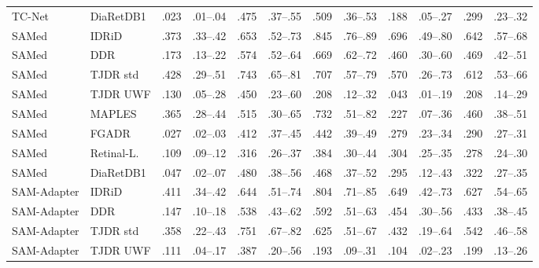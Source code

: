 \begin{landscape}
{\begin{longtable}{l l c c c c c c c c c c}
TC-Net & DiaRetDB1 & .023 & \scriptsize .01--.04 & .475 & \scriptsize .37--.55 & .509 & \scriptsize .36--.53 & .188 & \scriptsize .05--.27 & .299 & \scriptsize .23--.32 \\
SAMed & IDRiD & .373 & \scriptsize .33--.42 & .653 & \scriptsize .52--.73 & .845 & \scriptsize .76--.89 & .696 & \scriptsize .49--.80 & .642 & \scriptsize .57--.68 \\
SAMed & DDR & .173 & \scriptsize .13--.22 & .574 & \scriptsize .52--.64 & .669 & \scriptsize .62--.72 & .460 & \scriptsize .30--.60 & .469 & \scriptsize .42--.51 \\
SAMed & TJDR std & .428 & \scriptsize .29--.51 & .743 & \scriptsize .65--.81 & .707 & \scriptsize .57--.79 & .570 & \scriptsize .26--.73 & .612 & \scriptsize .53--.66 \\
SAMed & TJDR UWF & .130 & \scriptsize .05--.28 & .450 & \scriptsize .23--.60 & .208 & \scriptsize .12--.32 & .043 & \scriptsize .01--.19 & .208 & \scriptsize .14--.29 \\
SAMed & MAPLES & .365 & \scriptsize .28--.44 & .515 & \scriptsize .30--.65 & .732 & \scriptsize .51--.82 & .227 & \scriptsize .07--.36 & .460 & \scriptsize .38--.51 \\
SAMed & FGADR & .027 & \scriptsize .02--.03 & .412 & \scriptsize .37--.45 & .442 & \scriptsize .39--.49 & .279 & \scriptsize .23--.34 & .290 & \scriptsize .27--.31 \\
SAMed & Retinal-L. & .109 & \scriptsize .09--.12 & .316 & \scriptsize .26--.37 & .384 & \scriptsize .30--.44 & .304 & \scriptsize .25--.35 & .278 & \scriptsize .24--.30 \\
SAMed & DiaRetDB1 & .047 & \scriptsize .02--.07 & .480 & \scriptsize .38--.56 & .468 & \scriptsize .37--.52 & .295 & \scriptsize .12--.43 & .322 & \scriptsize .27--.35 \\
SAM-Adapter & IDRiD & .411 & \scriptsize .34--.42 & .644 & \scriptsize .51--.74 & .804 & \scriptsize .71--.85 & .649 & \scriptsize .42--.73 & .627 & \scriptsize .54--.65 \\
SAM-Adapter & DDR & .147 & \scriptsize .10--.18 & .538 & \scriptsize .43--.62 & .592 & \scriptsize .51--.63 & .454 & \scriptsize .30--.56 & .433 & \scriptsize .38--.45 \\
SAM-Adapter & TJDR std & .358 & \scriptsize .22--.43 & .751 & \scriptsize .67--.82 & .625 & \scriptsize .51--.67 & .432 & \scriptsize .19--.64 & .542 & \scriptsize .46--.58 \\
SAM-Adapter & TJDR UWF & .111 & \scriptsize .04--.17 & .387 & \scriptsize .20--.56 & .193 & \scriptsize .09--.31 & .104 & \scriptsize .02--.23 & .199 & \scriptsize .13--.26 \\

\end{longtable}}
\end{landscape}
